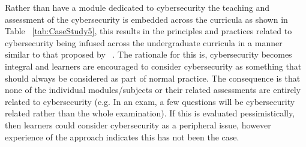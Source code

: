 \documentclass[conference]{IEEEtran}
\begin{document}
Rather than have a module dedicated to cybersecurity the teaching and assessment of the cybersecurity is embedded across the curricula as shown in Table ~\ref{tab:CaseStudy5}, this results in the principles and practices related to cybersecurity being infused across the undergraduate curricula in a manner similar to that proposed by ~\cite{Blair2020}. The rationale for this is, cybersecurity becomes integral and learners are encouraged  to consider cybersecurity as something that should always be considered as part of normal practice. The consequence is that none of the individual modules/subjects or their related assessments are entirely related to cybersecurity (e.g. In an exam, a few questions will be cybersecurity related rather than the whole examination). If this is evaluated pessimistically, then learners could consider cybersecurity as a peripheral issue, however experience of the approach indicates this has not been the case.
\end{document}
